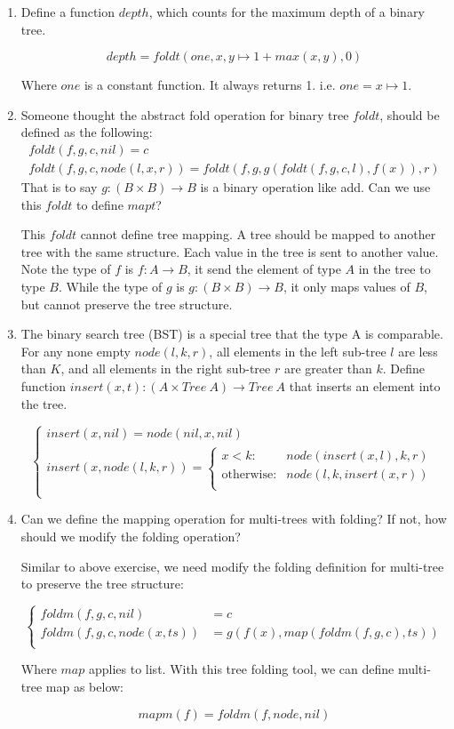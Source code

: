 \documentclass[UTF8]{article}
\begin{document}
\begin{enumerate}
\item {Define a function $depth$, which counts for the maximum depth of a binary tree.}

\[
depth = foldt(one, x, y \mapsto 1 + max(x, y), 0)
\]

Where $one$ is a constant function. It always returns 1. i.e. $one = x \mapsto 1$.

\item {Someone thought the abstract fold operation for binary tree $foldt$, should be defined as the following:
\[
\begin{array}{l}
foldt(f, g, c, nil) = c \\
foldt(f, g, c, node(l, x, r)) = foldt(f, g, g(foldt(f, g, c, l), f(x)), r)
\end{array}
\]
That is to say $g : (B \times B) \to B$ is a binary operation like add. Can we use this $foldt$ to define $mapt$?}

This $foldt$ cannot define tree mapping. A tree should be mapped to another tree with the same structure. Each value in the tree is sent to another value. Note the type of $f$ is $f : A \to B$, it send the element of type $A$ in the tree to type $B$. While the type of $g$ is $g : (B \times B) \to B$, it only maps values of $B$, but cannot preserve the tree structure.

\item {The binary search tree (BST) is a special tree that the type A is comparable. For any none empty $node(l, k, r)$, all elements in the left sub-tree $l$ are less than $K$, and all elements in the right sub-tree $r$ are greater than $k$. Define function $insert(x, t) : (A \times Tree\ A) \to Tree\ A$ that inserts an element into the tree.}

\[ \begin{cases}
insert(x, nil) = node(nil, x, nil) \\
insert(x, node(l, k, r)) = \begin{cases}
  x < k: & node(insert(x, l), k, r) \\
  \text{otherwise}: & node(l, k, insert(x, r)) \\
\end{cases} \\
\end{cases}\]

\item {Can we define the mapping operation for multi-trees with folding? If not, how should we modify the folding operation?}

Similar to above exercise, we need modify the folding definition for multi-tree to preserve the tree structure:

\[
\begin{cases}
foldm(f, g, c, nil) & = c \\
foldm(f, g, c, node(x, ts)) & = g(f(x), map(foldm(f, g, c), ts)) \\
\end{cases}
\]

Where $map$ applies to list. With this tree folding tool, we can define multi-tree map as below:

\[
mapm(f) = foldm(f, node, nil)
\]

\end{enumerate}
\end{document}

